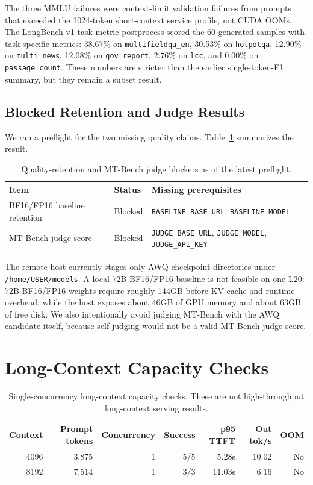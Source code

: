 \documentclass[11pt]{article}
\begin{document}
The three MMLU failures were context-limit validation failures from prompts that
exceeded the 1024-token short-context service profile, not CUDA OOMs. The
LongBench v1 task-metric postprocess scored the 60 generated samples with
task-specific metrics: 38.67\% on \texttt{multifieldqa\_en}, 30.53\% on
\texttt{hotpotqa}, 12.90\% on \texttt{multi\_news}, 12.08\% on
\texttt{gov\_report}, 2.76\% on \texttt{lcc}, and 0.00\% on
\texttt{passage\_count}. These numbers are stricter than the earlier
single-token-F1 summary, but they remain a subset result.

\subsection{Blocked Retention and Judge Results}

We ran a preflight for the two missing quality claims. Table~\ref{tab:blockers}
summarizes the result.

\begin{table}[h]
\centering
\small
\begin{tabular}{lll}
\toprule
Item & Status & Missing prerequisites \\
\midrule
BF16/FP16 baseline retention & Blocked &
\texttt{BASELINE\_BASE\_URL}, \texttt{BASELINE\_MODEL} \\
MT-Bench judge score & Blocked &
\texttt{JUDGE\_BASE\_URL}, \texttt{JUDGE\_MODEL}, \texttt{JUDGE\_API\_KEY} \\
\bottomrule
\end{tabular}
\caption{Quality-retention and MT-Bench judge blockers as of the latest
preflight.}
\label{tab:blockers}
\end{table}

The remote host currently stages only AWQ checkpoint directories under
\texttt{/home/USER/models}. A local 72B BF16/FP16 baseline is not feasible on
one L20: 72B BF16/FP16 weights require roughly 144GB before KV cache and runtime
overhead, while the host exposes about 46GB of GPU memory and about 63GB of
free disk. We also intentionally avoid judging MT-Bench with the AWQ candidate
itself, because self-judging would not be a valid MT-Bench judge score.

\section{Long-Context Capacity Checks}
\label{sec:long_context}

\begin{table}[h]
\centering
\small
\begin{tabular}{rrrrrrr}
\toprule
Context & Prompt tokens & Concurrency & Success & p95 TTFT & Out tok/s & OOM \\
\midrule
4096 & 3,875 & 1 & 5/5 & 5.28s & 10.02 & No \\
8192 & 7,514 & 1 & 3/3 & 11.03s & 6.16 & No \\
\bottomrule
\end{tabular}
\caption{Single-concurrency long-context capacity checks. These are not
high-throughput long-context serving results.}
\label{tab:long_context}
\end{table}
\end{document}
